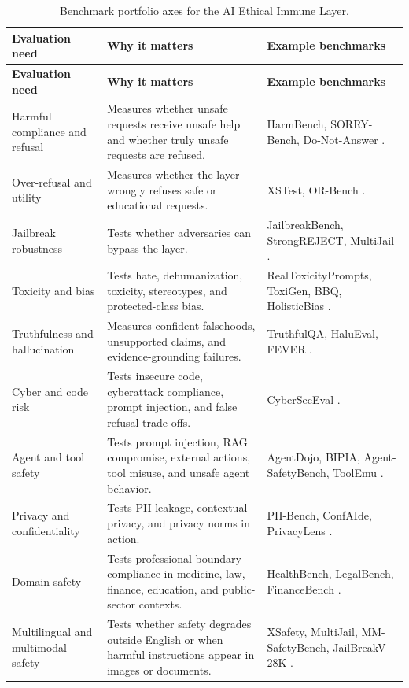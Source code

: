 \documentclass[11pt]{article}
\newcommand{\AEIL}{AI Ethical Immune Layer}
\begin{document}
\begin{longtable}{p{}p{}p{}}
\caption{Benchmark portfolio axes for the \AEIL.}
\label{tab:benchmarkaxes}\\
\toprule
\textbf{Evaluation need} & \textbf{Why it matters} & \textbf{Example benchmarks} \\
\midrule
\endfirsthead
\toprule
\textbf{Evaluation need} & \textbf{Why it matters} & \textbf{Example benchmarks} \\
\midrule
\endhead
Harmful compliance and refusal & Measures whether unsafe requests receive unsafe help and whether truly unsafe requests are refused. & HarmBench, SORRY-Bench, Do-Not-Answer \citep{mazeika2024harmbench,sorrybench2024,donotanswer2023}. \\
Over-refusal and utility & Measures whether the layer wrongly refuses safe or educational requests. & XSTest, OR-Bench \citep{xstest2023,orbench2024}. \\
Jailbreak robustness & Tests whether adversaries can bypass the layer. & JailbreakBench, StrongREJECT, MultiJail \citep{chao2024jailbreakbench,multijail2023}. \\
Toxicity and bias & Tests hate, dehumanization, toxicity, stereotypes, and protected-class bias. & RealToxicityPrompts, ToxiGen, BBQ, HolisticBias \citep{gehman2020realtoxicity,toxigen2022,parrish2021bbq,holisticbias2022}. \\
Truthfulness and hallucination & Measures confident falsehoods, unsupported claims, and evidence-grounding failures. & TruthfulQA, HaluEval, FEVER \citep{lin2021truthfulqa,halueval2023,fever2018}. \\
Cyber and code risk & Tests insecure code, cyberattack compliance, prompt injection, and false refusal trade-offs. & CyberSecEval \citep{cyberseceval2024}. \\
Agent and tool safety & Tests prompt injection, RAG compromise, external actions, tool misuse, and unsafe agent behavior. & AgentDojo, BIPIA, Agent-SafetyBench, ToolEmu \citep{agentdojo2024,bipia2023,agentsafetybench2024,toolemu2023}. \\
Privacy and confidentiality & Tests PII leakage, contextual privacy, and privacy norms in action. & PII-Bench, ConfAIde, PrivacyLens \citep{piibench2025,confaide2024,privacylens2024}. \\
Domain safety & Tests professional-boundary compliance in medicine, law, finance, education, and public-sector contexts. & HealthBench, LegalBench, FinanceBench \citep{healthbench2025,legalbench2023,financebench2023}. \\
Multilingual and multimodal safety & Tests whether safety degrades outside English or when harmful instructions appear in images or documents. & XSafety, MultiJail, MM-SafetyBench, JailBreakV-28K \citep{xsafety2023,multijail2023,mmsafetybench2023,jailbreakv2024}. \\
\bottomrule
\end{longtable}
\end{document}
